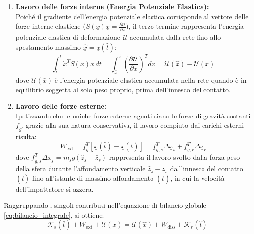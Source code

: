 \begin{enumerate}
  \item \textbf{Lavoro delle forze interne (Energia Potenziale Elastica):}\\
  Poiché il gradiente dell'energia potenziale elastica corrisponde al vettore delle forze interne elastiche ($S(\underline{x})\underline{x} = \frac{\partial \mathcal{U}}{\partial \underline{x}}$), il terzo termine rappresenta l'energia potenziale elastica di deformazione $\mathcal{U}$ accumulata dalla rete fino allo spostamento massimo $\hat{\underline{x}} = \underline{x}(\hat{t})$:
  \begin{equation}
    \int_{\bar{t}}^{\hat{t}} \underline{\dot{x}}^T S(\underline{x}) \underline{x} \, dt = \int_{\bar{\underline{x}}}^{\hat{\underline{x}}} \left( \frac{\partial \mathcal{U}}{\partial \underline{x}} \right) ^T d\underline{x} = \mathcal{U}(\hat{\underline{x}}) - \mathcal{U}(\bar{\underline{x}})
  \end{equation}
  dove $\mathcal{U}(\bar{\underline{x}})$ è l'energia potenziale elastica accumulata nella rete quando è in equilibrio soggetta al solo peso proprio, prima dell'innesco del contatto.

  \item \textbf{Lavoro delle forze esterne:}\\
    Ipotizzando che le uniche forze esterne agenti siano le forze di gravità costanti $\underline{f}_g$, grazie alla sua natura conservativa, il lavoro compiuto dai carichi esterni risulta:
    \begin{equation}
        W_{\text{ext}} = \underline{f}_g^T \left[ \underline{x}(\hat{t}) - \underline{x}(\bar{t}) \right] = \underline{f}_{g,s}^T \Delta \underline{x}_s + \underline{f}_{g,r}^T \Delta \underline{x}_r
    \end{equation}
    dove $\underline{f}_{g,s}^T \Delta \underline{x}_{s} = m_{\text{s}} g (\hat{z}_s - \bar{z}_s)$ rappresenta il lavoro svolto dalla forza peso della sfera durante l'affondamento verticale $\hat{z}_s - \bar{z}_s$ dall'innesco del contatto $(\bar{t})$ fino all'istante di massimo affondamento $(\hat{t})$, in cui la velocità dell'impattatore si azzera.
\end{enumerate}
Raggruppando i singoli contributi nell'equazione di bilancio globale \eqref{eq:bilancio_integrale}, si ottiene:
\begin{equation}
    \mathcal{K}_s(\bar{t}) + W_{\text{ext}} + \mathcal{U}(\bar{\underline{x}}) = \mathcal{U}(\hat{\underline{x}}) + W_{\text{diss}} + \mathcal{K}_{r}(\hat{t})
    \label{eq:bilancio_completo}
\end{equation}

